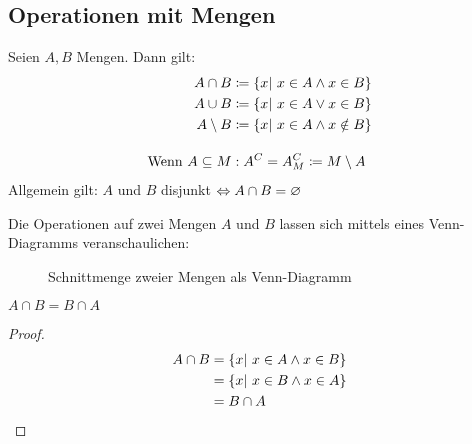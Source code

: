 \subsection{Operationen mit Mengen}

\begin{definition}
    Seien $A, B$ Mengen. Dann gilt:
    \begin{align*}
        A\cap B &\coloneqq \left\{x|~x\in A \land x\in B\right\}\\
        A\cup B &\coloneqq \left\{x|~x\in A \lor x\in B\right\}\\
        A\setminus B &\coloneqq \left\{x|~x\in A \land x\notin B\right\}\\[10pt]
        \text{Wenn } A\subseteq M&: A^{C} = A^{C}_{M} \coloneqq M\setminus A
    \end{align*}
    Allgemein gilt: $A$ und $B$ disjunkt $\Leftrightarrow{} A\cap B = \varnothing$
\end{definition}

\begin{visualisierung}
    Die Operationen auf zwei Mengen $A$ und $B$ lassen sich mittels eines Venn-Diagramms veranschaulichen:
    \begin{figure}[H]
        \centering
        \caption{Schnittmenge zweier Mengen als Venn-Diagramm}
    \end{figure}
\end{visualisierung}


\begin{lemma}
    $A\cap B = B \cap A$
    \begin{proof}
        \begin{align*}
            A\cap B &= \left\{x|~x\in A \land x \in B\right\}\\
            &= \left\{x|~x\in B \land x \in A\right\}\\
            &= B\cap A\qedhere
        \end{align*}
    \end{proof}
\end{lemma}

